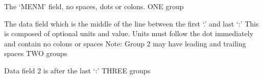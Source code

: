 \documentclass[letterpaper,10pt,english]{sphinxmanual}
\begin{document}
\begin{fulllineitems}
\label{\detokenize{ref/LAS/core/LASRead:TotalDepth.LAS.core.LASRead.RE_LINE_FIELD_0}}
The ‘MENM’ field, no spaces, dots or colons.
ONE group

\end{fulllineitems}


\begin{fulllineitems}
\label{\detokenize{ref/LAS/core/LASRead:TotalDepth.LAS.core.LASRead.RE_LINE_FIELD_1}}
The data field which is the middle of the line between the first ‘.’ and last ‘:’
This is composed of optional units and value.
Units must follow the dot immediately and contain no colons or spaces
Note: Group 2 may have leading and trailing spaces
TWO groups

\end{fulllineitems}


\begin{fulllineitems}
\label{\detokenize{ref/LAS/core/LASRead:TotalDepth.LAS.core.LASRead.RE_LINE_FIELD_2}}
Data field 2 is after the last ‘:’
THREE groups

\end{fulllineitems}

\end{document}
